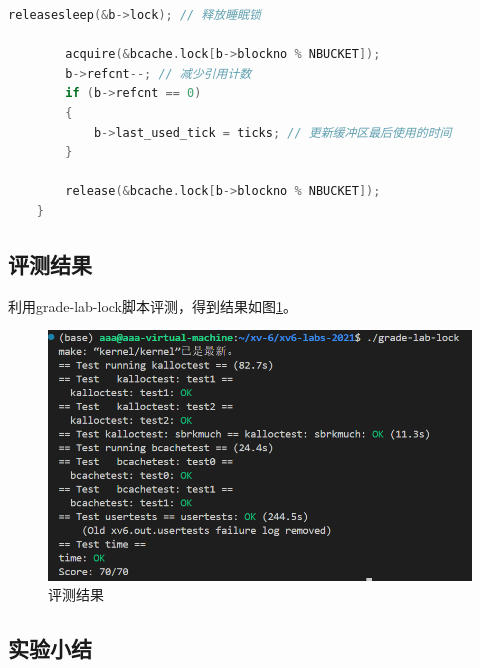 \begin{enumerate}
\begin{itemize}
\begin{lstlisting}[language=c,title=对brelse函数的修改]
        releasesleep(&b->lock); // 释放睡眠锁

        acquire(&bcache.lock[b->blockno % NBUCKET]);
        b->refcnt--; // 减少引用计数
        if (b->refcnt == 0)
        {
            b->last_used_tick = ticks; // 更新缓冲区最后使用的时间
        }

        release(&bcache.lock[b->blockno % NBUCKET]);
    }
              \end{lstlisting}
          \end{itemize}
\end{enumerate}

\subsection{评测结果}

利用grade-lab-lock脚本评测，得到结果如图\ref{fig:lock}。
\begin{figure}[h]
    \centering
    \includegraphics[width=\linewidth]{pics/lock评测结果.png}
    \caption{评测结果}
    \label{fig:lock}
\end{figure}

\subsection{实验小结}